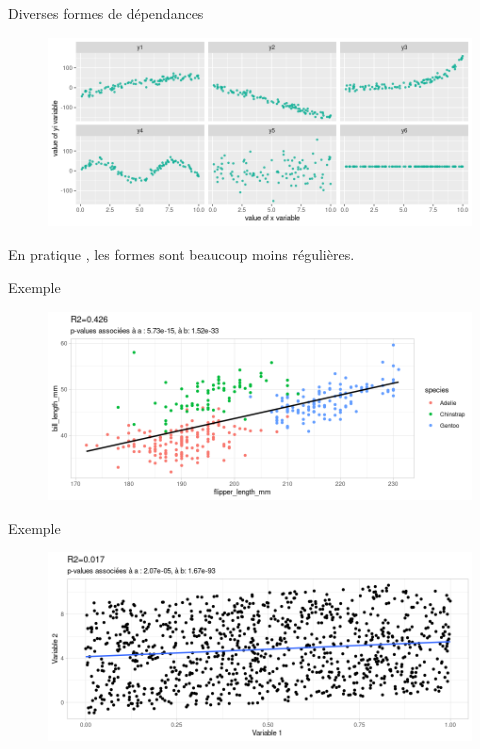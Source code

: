 \documentclass{beamer}
\begin{document}
\begin{frame}{Diverses formes de dépendances}
\begin{figure}
\includegraphics[width=\linewidth]{img/formes_dependances.png}
\end{figure}

En pratique , les formes sont beaucoup moins régulières.

\end{frame}




\begin{frame}{Exemple}

\begin{figure}
\includegraphics[width=\linewidth]{img/reglin_example1.png}
\end{figure}

\end{frame}


\begin{frame}{Exemple}

\begin{figure}
\includegraphics[width=\linewidth]{img/reglin_example2.png}
\end{figure}

\end{frame}
\end{document}
